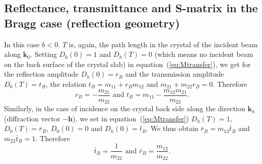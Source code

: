 \documentclass[preprint]{iucr}              %
\newcommand{\inred}[1]{{\color{red}#1}}
\begin{document}
%
\subsection{\inred{Reflectance, transmittance and S-matrix} in the Bragg case (reflection geometry)}
\label{sec:TTsolutionsBragg}

In this case $b<0$. $T$ is, again, the path length in the crystal of the incident beam along $\textbf{k}_0$.
Setting $D_0(0)=1$ and $D_h(T)=0$ (which means no incident beam on the back surface of the crystal slab) in equation~(\ref{eq:Mtransfer}), we get for the reflection amplitude  $D_h(0)=r_B$ and the transmission amplitude $D_0(T)=t_B$, the relation $t_B=m_{11}+r_B m_{12}$ and $m_{21} + m_{22} r_B=0$. Therefore
\begin{equation}
    r_B = -\frac{m_{21}}{m_{22}} \text{ and } t_B = m_{11}-\frac{m_{12} m_{21}}{m_{22}}.
\end{equation}
Similarly, in the case of incidence on the crystal back side along the direction $\textbf{k}_h$ (diffraction vector $-\textbf{h}$), we set in equation~(\ref{eq:Mtransfer}) $D_h(T)=1$, $D_0(T)=\bar{r}_B$, $D_0(0)=0$ and $D_h(0)=\bar{t}_B$. We thus obtain $\bar{r}_B=m_{12} \bar{t}_B$ and $m_{22} \bar{t}_B=1$. Therefore 
\begin{equation}
    \bar{t}_B = \frac{1}{m_{22}} \text{ and } \bar{r}_B = \frac{m_{12}}{m_{22}}.
\end{equation}
\end{document}
